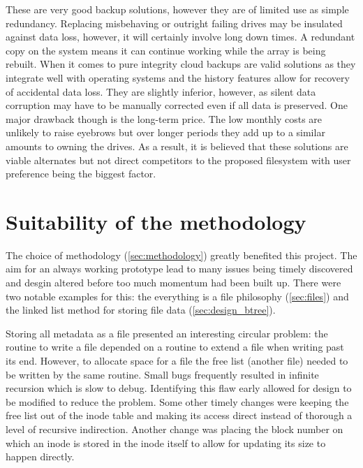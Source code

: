         These are very good backup solutions, however they are of limited use
        as simple redundancy. Replacing misbehaving or outright failing drives
        may be insulated against data loss, however, it will certainly involve long
        down times. A redundant copy on the system means it can
        continue working while the array is being rebuilt. When it comes to
        pure integrity cloud backups are valid solutions as
        they integrate well with operating systems and the history features
        allow for recovery of accidental data loss. They are slightly
        inferior, however, as silent data corruption may have to be manually
        corrected even if all data is preserved. One major drawback though is
        the long-term price. The low monthly costs are unlikely to raise
        eyebrows but over longer periods they add up to a similar amounts to
        owning the drives. As a result, it is believed that these solutions are
        viable alternates but not direct competitors to the proposed
        filesystem with user preference being the biggest factor.

    \section{Suitability of the methodology}

        The choice of methodology (\autoref{sec:methodology}) greatly benefited
        this project. The aim for an always working prototype lead to many
        issues being timely discovered and desgin altered before too much
        momentum had been built up. There were two notable examples for this:
        the everything is a file philosophy (\autoref{sec:files}) and the linked
        list method for storing file data (\autoref{sec:design_btree}).

        Storing all metadata as a file presented an interesting circular
        problem: the routine to write a file depended on a routine to extend a
        file when writing past its end. However, to allocate space for a file
        the free list (another file) needed to be written by the same routine.
        Small bugs frequently resulted in infinite recursion which is slow to
        debug. Identifying this flaw early allowed for design to be modified to
        reduce the problem. Some other timely changes were keeping the free
        list out of the inode table and making its access direct instead of
        thorough a level of recursive indirection. Another change was placing
        the block number on which an inode is stored in the inode itself to
        allow for updating its size to happen directly.

